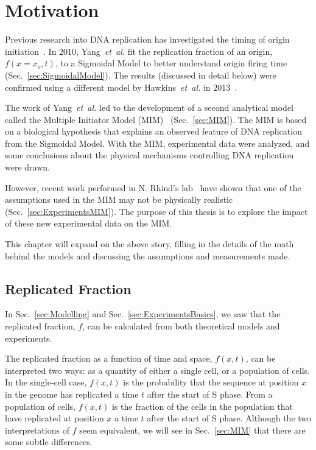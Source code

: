 \chapter{Motivation}
\label{ch:Motivation}

Previous research into DNA replication has investigated the timing of origin initiation~\cite{ScottsPaper,Bechhoefer2012374,deMouraModel1,deMouraModel2,StochasticTermination}.
In 2010, Yang~\emph{et~al.} fit the replication fraction of an origin, $f(x=x_o,t)$, to a Sigmoidal Model to better understand origin firing time~\cite{ScottsPaper} (Sec.~\ref{sec:SigmoidalModel}).
The results (discussed in detail below) were confirmed using a different model by Hawkins~\emph{et~al.} in 2013~\cite{StochasticTermination}.

The work of Yang~\emph{et~al.} led to the development of a second analytical model called the Multiple Initiator Model (MIM)~\cite{ScottsPaper} (Sec.~\ref{sec:MIM}).
The MIM is based on a biological hypothesis that explains an observed feature of DNA replication from the Sigmoidal Model.
With the MIM, experimental data were analyzed, and some conclusions about the physical mechanisms controlling DNA replication were drawn.

However, recent work performed in N. Rhind's lab~\cite{Rhind} have shown that one of the assumptions used in the MIM may not be physically realistic (Sec.~\ref{sec:ExperimentsMIM}).
The purpose of this thesis is to explore the impact of these new experimental data on the MIM.

This chapter will expand on the above story, filling in the details of the math behind the models and discussing the assumptions and measurements made.


	\section{Replicated Fraction}
	\label{sec:ReplicatedFraction}
	
	In Sec.~\ref{sec:Modelling} and Sec.~\ref{sec:ExperimentsBasics}, we saw that the replicated fraction, $f$, can be calculated from both theoretical models and experiments.
	
	The replicated fraction as a function of time and space, $f(x,t)$, can be interpreted two ways:
	as a quantity of either a single cell, or a population of cells.
	In the single-cell case, $f(x,t)$ is the probability that the sequence at position $x$ in the genome has replicated a time $t$ after the start of S phase.
	From a population of cells, $f(x,t)$ is the fraction of the cells in the population that have replicated at position $x$ a time $t$ after the start of S phase.
	Although the two interpretations of $f$ seem equivalent, we will see in Sec.~\ref{sec:MIM} that there are some subtle differences.
	
